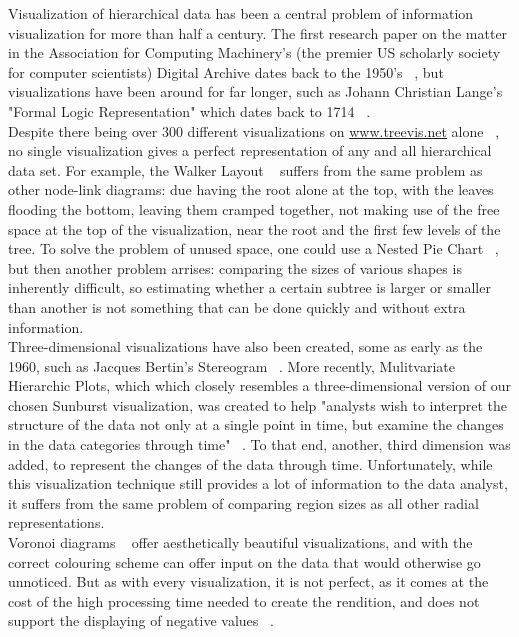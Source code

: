 \documentclass[journal, 9pt]{vgtc}                %
\begin{document}
Visualization of hierarchical data has been a central problem of information visualization for more than half a century. The first research paper on the matter in the Association for Computing Machinery's
(the premier US scholarly society for computer scientists) Digital Archive dates back to the 1950's ~\cite{ACM}, but visualizations have been around for far longer, such as Johann Christian Lange's "Formal
Logic Representation" which dates back to 1714 ~\cite{Baron1969}.\\
Despite there being over 300 different visualizations on \url{www.treevis.net} alone ~\cite{treevis}, no single visualization gives a perfect representation of any and all hierarchical data set. For example,
the Walker Layout ~\cite{Walker1990} suffers from the same problem as other node-link diagrams: due having the root alone at the top, with the leaves flooding
the bottom, leaving them cramped together, not making use of the free space at the top of the visualization, near the root and the first few levels of the tree. To solve the problem of unused space, one
could use a Nested Pie Chart ~\cite{Sukla2005}, but then another problem arrises: comparing the sizes of various shapes is inherently difficult, so estimating whether a certain subtree is larger or smaller
than another is not something that can be done quickly and without extra information.\\
Three-dimensional visualizations have also been created, some as early as the 1960, such as Jacques Bertin's Stereogram ~\cite{Bertin1967}. More recently, Mulitvariate Hierarchic Plots, which
which closely resembles a three-dimensional version of our chosen Sunburst visualization, was created to help "analysts wish to interpret the structure of the data not only at a single point in
time, but examine the changes in the data categories through time" ~\cite{Tekusova2008}. To that end, another, third dimension was added, to represent the changes of the data through
time. Unfortunately, while this visualization technique still provides a lot of information to the data analyst, it suffers from the same problem of comparing region sizes as all other radial
representations.\\
Voronoi diagrams ~\cite{Balzer2005} offer aesthetically beautiful visualizations, and with the correct colouring scheme can offer input on the data that would 
otherwise go unnoticed.  But as with every visualization, it is not perfect, as it comes at the cost of the high processing time needed to create the rendition,
and does not support the displaying of negative values ~\cite{qlik}.\\	
\\
\end{document}
